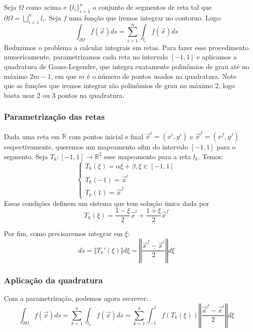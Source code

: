 \documentclass[
	12pt,				%
	oneside,			%
	a4paper,			%
	]{article}
\begin{document}
    Seja $\Omega$ como acima e $\{ l_i \}^n_{i=1}$ o conjunto de segmentos de reta tal que $\partial \Omega = \bigcup_{i=1}^n l_i$. Seja $f$ uma função que iremos integrar no contorno. Logo:
    \begin{equation}
        \int_{\partial \Omega} f(\vec{x}) ds = \sum_{i=1}^{n} \int_{l_i} f(\vec{x}) ds
    \end{equation}
    Reduzimos o problema a calcular integrais em retas. Para fazer esse procedimento numericamente, parametrizamos cada reta no intervalo $[-1,1]$ e aplicamos a quadratura de Gauss-Legendre, que integra exatamente polinômios de grau até no máximo $2m-1$, em que $m$ é o número de pontos usados na quadratura. Note que as funções que iremos integrar são polinômios de grau no máximo 2, logo basta usar 2 ou 3 pontos na quadratura. 

    \subsubsection{Parametrização das retas}
    Dada uma reta em $\mathbb{R}$ com pontos inicial e final $\vec{x}^i = (x^i, y^i)$ e $\vec{x}^f = (x^f, y^f)$ respectivamente, queremos um mapeamento afim do intervalo $[-1,1]$ para o segmento. Seja $T_{k}:[-1,1] \to \mathbb{R}^2$ esse mapeamento para a reta $l_k$. Temos:
    \[
        \begin{cases}
            T_k(\xi) = \alpha \xi + \beta, \xi \in [-1,1] \\
            T_k(-1) = \vec{x}^i \\
            T_k(1) = \vec{x}^f
        \end{cases}
    \] 
    Essas condições definem um sistema que tem solução única dada por
    \[
        T_k(\xi) = \frac{1-\xi}{2}\vec{x}^i + \frac{1 + \xi}{2} \vec{x}^f
    \]

    Por fim, como precisaremos integrar em $\xi$:
    \[
        ds = \Vert T_k'(\xi)\Vert d \xi = \left\Vert \frac{\vec{x}^f - \vec{x}^i}{2} \right\Vert d \xi
    \]

    \subsubsection{Aplicação da quadratura}
    Com a parametrização, podemos agora escrever:
    \begin{equation}
        \int_{\partial \Omega} f(\vec{x}) ds = \sum_{k=1}^{n} \int_{l_k} f(\vec{x}) ds = \sum_{k=1}^{n} \int^1_{-1} f(T_k(\xi)) \left\Vert \frac{\vec{x}^f - \vec{x}^i}{2} \right\Vert d \xi
        \label{eq:param}
    \end{equation}
\end{document}
